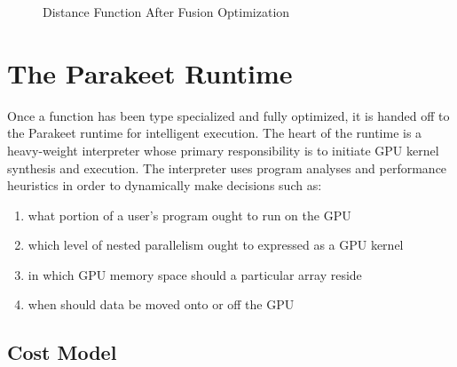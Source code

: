 \documentclass[preprint]{sigplanconf}
\begin{document}
\begin{figure}[h!]

\caption{Distance Function After Fusion Optimization}
\label{DistFuse}
\end{figure}

\section{The Parakeet Runtime}
\label{runtime}

Once a function has been type specialized and fully optimized, it is handed off to the Parakeet runtime for intelligent execution. The heart of the runtime is a heavy-weight interpreter whose primary responsibility is to initiate GPU kernel synthesis and execution. The interpreter uses program analyses and performance heuristics in order to dynamically make decisions such as: 
\begin{enumerate}
\item what portion of a user's program ought to run on the GPU 
\item which level of nested parallelism ought to expressed as a GPU kernel
\item in which GPU memory space should a particular array reside 
\item when should data be moved onto or off the GPU
\end{enumerate} 

\subsection{Cost Model}
\label{costmodel}
\end{document}
